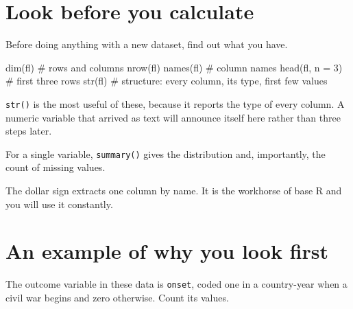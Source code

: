 \documentclass[
  a4paper,
]{scrbook}
\newenvironment{Shaded}{\begin{snugshade}}{\end{snugshade}}
\newcommand{\AttributeTok}[1]{\textcolor[rgb]{0.40,0.45,0.13}{#1}}
\newcommand{\CommentTok}[1]{\textcolor[rgb]{0.37,0.37,0.37}{#1}}
\newcommand{\DecValTok}[1]{\textcolor[rgb]{0.68,0.00,0.00}{#1}}
\newcommand{\FunctionTok}[1]{\textcolor[rgb]{0.28,0.35,0.67}{#1}}
\newcommand{\NormalTok}[1]{\textcolor[rgb]{0.00,0.23,0.31}{#1}}
\newcommand{\SpecialCharTok}[1]{\textcolor[rgb]{0.37,0.37,0.37}{#1}}
\begin{document}
\section*{Look before you calculate}\label{look-before-you-calculate}


Before doing anything with a new dataset, find out what you have.

\begin{Shaded}
\begin{Highlighting}[]
\FunctionTok{dim}\NormalTok{(fl)          }\CommentTok{\# rows and columns}
\FunctionTok{nrow}\NormalTok{(fl)}
\FunctionTok{names}\NormalTok{(fl)        }\CommentTok{\# column names}
\FunctionTok{head}\NormalTok{(fl, }\AttributeTok{n =} \DecValTok{3}\NormalTok{)  }\CommentTok{\# first three rows}
\FunctionTok{str}\NormalTok{(fl)          }\CommentTok{\# structure: every column, its type, first few values}
\end{Highlighting}
\end{Shaded}

\texttt{str()} is the most useful of these, because it reports the type
of every column. A numeric variable that arrived as text will announce
itself here rather than three steps later.

For a single variable, \texttt{summary()} gives the distribution and,
importantly, the count of missing values.

\begin{Shaded}
\end{Shaded}

The dollar sign extracts one column by name. It is the workhorse of base
R and you will use it constantly.

\section*{An example of why you look
first}\label{an-example-of-why-you-look-first}


The outcome variable in these data is \texttt{onset}, coded one in a
country-year when a civil war begins and zero otherwise. Count its
values.
\end{document}

